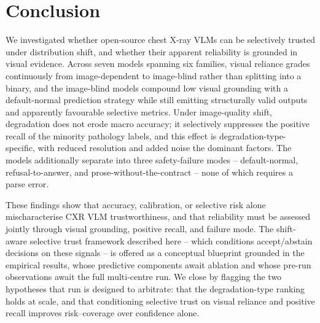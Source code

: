 \section{Conclusion}

We investigated whether open-source chest X-ray VLMs can be selectively trusted under distribution shift, and whether their apparent reliability is grounded in visual evidence. Across seven models spanning six families, visual reliance grades continuously from image-dependent to image-blind rather than splitting into a binary, and the image-blind models compound low visual grounding with a default-normal prediction strategy while still emitting structurally valid outputs and apparently favourable selective metrics. Under image-quality shift, degradation does not erode macro accuracy; it selectively suppresses the positive recall of the minority pathology labels, and this effect is degradation-type-specific, with reduced resolution and added noise the dominant factors. The models additionally separate into three safety-failure modes -- default-normal, refusal-to-answer, and prose-without-the-contract -- none of which requires a parse error.

These findings show that accuracy, calibration, or selective risk alone mischaracterise CXR VLM trustworthiness, and that reliability must be assessed jointly through visual grounding, positive recall, and failure mode. The shift-aware selective trust framework described here -- which conditions accept/abstain decisions on these signals -- is offered as a conceptual blueprint grounded in the empirical results, whose predictive components await ablation and whose pre-run observations await the full multi-centre run. We close by flagging the two hypotheses that run is designed to arbitrate: that the degradation-type ranking holds at scale, and that conditioning selective trust on visual reliance and positive recall improves risk--coverage over confidence alone.